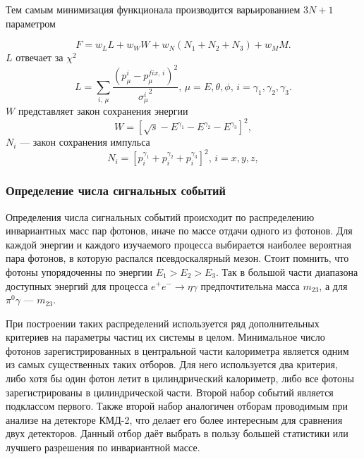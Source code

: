 Тем самым минимизация функционала производится варьированием $3 N + 1$ параметром



\begin{equation}
F = w_L L + w_W W + w_N \left( N_1 + N_2 + N_3 \right) + w_M M.
\end{equation}
$L$ отвечает за $\chi^{2}$
\begin{equation}
	L
	= 
	\sum_{i, \, \mu} 
	\frac{ \left( p^{i}_\mu -p^{fix,\,i}_\mu \right)^2 }{{\sigma^i_\mu}^2} , 
	\, \mu = E, \theta, \phi, \, i = \gamma_1, \gamma_2, \gamma_3.
\end{equation}
$W$ представляет закон сохранения энергии
\begin{equation}
	W = \left[ \sqrt{s} - E^{\gamma_1}- E^{\gamma_2}- E^{\gamma_3} \right]^2 ,
\end{equation}
$N_i$ --- закон сохранения импульса
\begin{equation}
	N_i = \left[ p_i^{\gamma_1} + p_i^{\gamma_2} + p_i^{\gamma_3} \right]^2, \, i=x,y,z ,
\end{equation}



\subsubsection{Определение числа сигнальных событий}

Определения числа сигнальных событий происходит по распределению инвариантных масс пар фотонов, иначе по массе отдачи одного из фотонов. Для каждой энергии и каждого  изучаемого процесса выбирается наиболее вероятная пара фотонов, в которую распался псевдоскалярный мезон. Стоит помнить, что фотоны упорядоченны по энергии $E_1 > E_2 > E_3$. Так в большой части диапазона доступных энергий для процесса $e^+ e^- \to \eta \gamma$ предпочтительна масса $m_{23}$, а для $\pi^0 \gamma$ --- $m_{23}$.

При построении таких распределений используется ряд дополнительных критериев на параметры частиц их системы в целом.
Минимальное число фотонов зарегистрированных в центральной части калориметра является одним из самых существенных таких отборов.
Для него используется два критерия,
либо хотя бы один фотон летит в цилиндрический калориметр,
либо все фотоны зарегистрированы в цилиндрической части.
Второй набор событий является подклассом первого.
Также второй набор аналогичен отборам проводимым при анализе на детекторе КМД-2,
что делает его более интересным для сравнения двух детекторов.
Данный отбор даёт выбрать в пользу большей статистики или лучшего разрешения по инвариантной массе.


